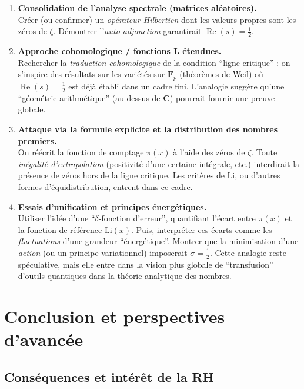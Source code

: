 \documentclass[11pt]{article}
\begin{document}
\begin{enumerate}
  \item \textbf{Consolidation de l'analyse spectrale (matrices aléatoires).} \\
  Créer (ou confirmer) un \emph{opérateur Hilbertien} dont les valeurs propres sont les zéros de $\zeta$. Démontrer l'\emph{auto-adjonction} garantirait $\operatorname{Re}(s)=\tfrac12$.
  
  \item \textbf{Approche cohomologique / fonctions L étendues.} \\
  Rechercher la \emph{traduction cohomologique} de la condition “ligne critique” : on s'inspire des résultats sur les variétés sur $\mathbf{F}_p$ (théorèmes de Weil) où $\operatorname{Re}(s)=\tfrac12$ est déjà établi dans un cadre fini. L'analogie suggère qu'une “géométrie arithmétique” (au-dessus de $\mathbf{C}$) pourrait fournir une preuve globale.

  \item \textbf{Attaque via la formule explicite et la distribution des nombres premiers.} \\
  On réécrit la fonction de comptage $\pi(x)$ à l’aide des zéros de $\zeta$. Toute \emph{inégalité d'extrapolation} (positivité d’une certaine intégrale, etc.) interdirait la présence de zéros hors de la ligne critique. Les critères de Li, ou d’autres formes d’équidistribution, entrent dans ce cadre.

  \item \textbf{Essais d’unification et principes énergétiques.} \\
  Utiliser l’idée d’une “$\delta$-fonction d’erreur”, quantifiant l'écart entre $\pi(x)$ et la fonction de référence $\mathrm{Li}(x)$. Puis, interpréter ces écarts comme les \emph{fluctuations} d’une grandeur “énergétique”. Montrer que la minimisation d’une \emph{action} (ou un principe variationnel) imposerait \(\sigma=\tfrac12\). Cette analogie reste spéculative, mais elle entre dans la vision plus globale de “transfusion” d'outils quantiques dans la théorie analytique des nombres.
\end{enumerate}

\section{Conclusion et perspectives d'avancée}

\subsection{Conséquences et intérêt de la RH}
\end{document}

